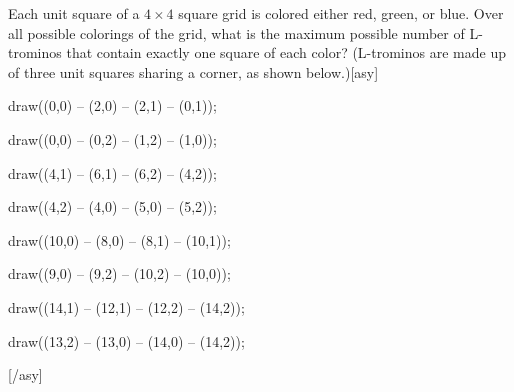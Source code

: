 Each unit square of a $4 \times 4$ square grid is colored either red, green, or blue. Over all possible colorings of the grid, what is the maximum possible number of L-trominos that contain exactly one square of each color? (L-trominos are made up of three unit squares sharing a corner, as shown below.)[asy]

draw((0,0) -- (2,0) -- (2,1) -- (0,1));

draw((0,0) -- (0,2) -- (1,2) -- (1,0));

draw((4,1) -- (6,1) -- (6,2) -- (4,2));

draw((4,2) -- (4,0) -- (5,0) -- (5,2));

draw((10,0) -- (8,0) -- (8,1) -- (10,1));

draw((9,0) -- (9,2) -- (10,2) -- (10,0));

draw((14,1) -- (12,1) -- (12,2) -- (14,2));

draw((13,2) -- (13,0) -- (14,0) -- (14,2));

[/asy]